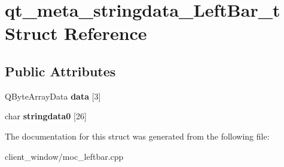 \hypertarget{structqt__meta__stringdata__LeftBar__t}{}\section{qt\+\_\+meta\+\_\+stringdata\+\_\+\+Left\+Bar\+\_\+t Struct Reference}
\label{structqt__meta__stringdata__LeftBar__t}
\subsection*{Public Attributes}
\begin{DoxyCompactItemize}
\item 
Q\+Byte\+Array\+Data {\bfseries data} \mbox{[}3\mbox{]}\hypertarget{structqt__meta__stringdata__LeftBar__t_a537ba155abe73a516b70a60172db555f}{}\label{structqt__meta__stringdata__LeftBar__t_a537ba155abe73a516b70a60172db555f}

\item 
char {\bfseries stringdata0} \mbox{[}26\mbox{]}\hypertarget{structqt__meta__stringdata__LeftBar__t_a2580dc8d260777544c09a644f6afefa7}{}\label{structqt__meta__stringdata__LeftBar__t_a2580dc8d260777544c09a644f6afefa7}

\end{DoxyCompactItemize}


The documentation for this struct was generated from the following file\+:\begin{DoxyCompactItemize}
\item 
client\+\_\+window/moc\+\_\+leftbar.\+cpp\end{DoxyCompactItemize}
